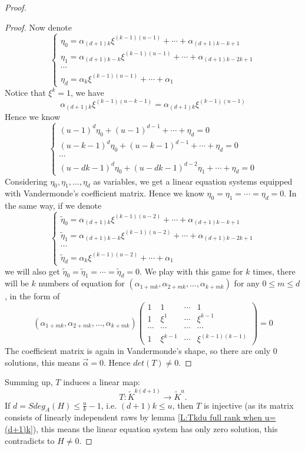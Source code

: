 \documentclass[11pt]{article}
\theoremstyle{definition}
\theoremstyle{plain}
\numberwithin{equation}{section}
\begin{document}
\begin{proof}
\begin{proof}
Now denote 
$$
\begin{cases}
\eta_0=\alpha_{(d+1)k}\xi^{(k-1)(u-1)}+\cdots+\alpha_{(d+1)k-k+1}
\\\eta_1=\alpha_{(d+1)k-k}\xi^{(k-1)(u-1)}+\cdots+\alpha_{(d+1)k-2k+1}
\\\cdots
\\\eta_d=\alpha_k\xi^{(k-1)(u-1)}+\cdots+\alpha_1
\end{cases}
$$
Notice that $\xi^k=1$, we have 
$$
\alpha_{(d+1)k}\xi^{(k-1)(u-k-1)}=\alpha_{(d+1)k}\xi^{(k-1)(u-1)}
$$
Hence we know 
$$
\begin{cases}
	(u-1)^d\eta_0+(u-1)^{d-1}+\cdots+\eta_d=0
	\\(u-k-1)^d\eta_0+(u-k-1)^{d-1}+\cdots+\eta_d=0
	\\\cdots
	\\(u-dk-1)^d\eta_0+(u-dk-1)^{d-2}\eta_1+\cdots+\eta_d=0
\end{cases}
$$
Considering $\eta_0,\eta_1,\dots,\eta_d$ as variables, we get a linear equation systems equipped with Vandermonde's coefficient matrix. Hence we know $\eta_0=\eta_1=\cdots=\eta_d=0$. In the same way, if we denote
$$
\begin{cases}
	\tilde{\eta}_0=\alpha_{(d+1)k}\xi^{(k-1)(u-2)}+\cdots+\alpha_{(d+1)k-k+1}
	\\\tilde{\eta}_1=\alpha_{(d+1)k-k}\xi^{(k-1)(u-2)}+\cdots+\alpha_{(d+1)k-2k+1}
	\\\cdots
	\\\tilde{\eta}_d=\alpha_k\xi^{(k-1)(u-2)}+\cdots+\alpha_1
\end{cases}
$$
we will also get $\tilde{\eta}_0=\tilde{\eta}_1=\cdots=\tilde{\eta}_d=0$. We play with this game for $k$ times, there will be $k$ numbers of equation for $(\alpha_{1+mk},\alpha_{2+mk},\dots,\alpha_{k+mk})$ for any $0\leq m\leq d$, in the form of 
$$
(\alpha_{1+mk},\alpha_{2+mk},\dots,\alpha_{k+mk})\begin{pmatrix}
	1 & 1 & \cdots & 1 \\
	1 & \xi^1 & \cdots & \xi^{k-1} \\
	\cdots & \cdots & \cdots & \cdots \\
	1 & \xi^{k-1} & \cdots & \xi^{(k-1)(k-1)}
\end{pmatrix}=0
$$
The coefficient matrix is again in Vandermonde's shape, so there are only $0$ solutions, this means $\overrightarrow{\alpha}=0$. Hence $det(T)\neq 0$.
\end{proof}
   
    
    
	Summing up, $T$ induces a linear map: 
	$$
	T:\tilde{K}^{k(d+1)} \rightarrow \tilde{K}^{u}.
	$$
If $d=Sdeg_A(H)\leq  \frac{u}{k}-1$, i.e. $(d+1)k\leq  u$, then  $T$ is injective (as its matrix consists of linearly independent raws by lemma \ref{L:Tkdu full rank when u=(d+1)k}), this means the linear equation system has  only zero solution, this contradicts to $H\neq 0$.
\end{proof}
\end{document}
